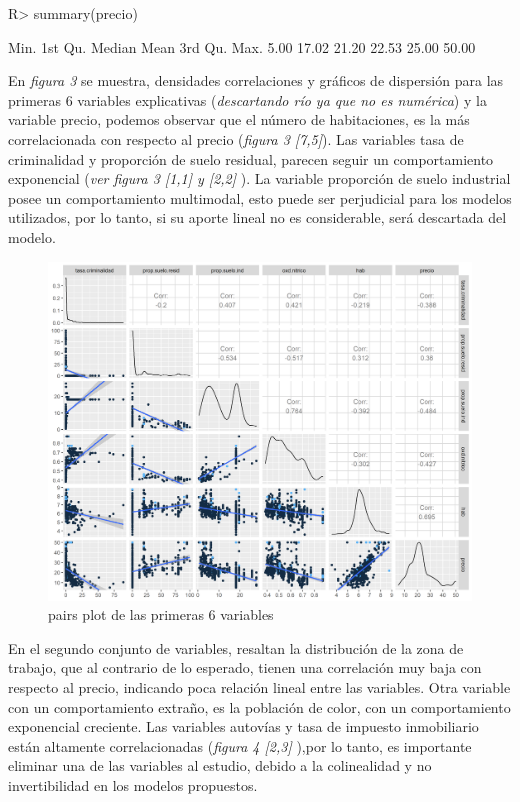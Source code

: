 \documentclass[nojss]{jss}
\begin{document}
\begin{CodeChunk}
\begin{CodeInput}
   R> summary(precio)
\end{CodeInput}

\begin{CodeOutput}
	Min.  1st Qu.  Median  Mean   3rd Qu.  Max. 
	5.00   17.02   21.20   22.53   25.00   50.00 
\end{CodeOutput}
\end{CodeChunk}

En \textit{figura 3} se muestra, densidades correlaciones y gráficos de dispersión para las primeras 6 variables explicativas (\textit{descartando río ya que no es numérica}) y la variable precio, podemos observar que el número de habitaciones, es la más correlacionada con respecto al precio (\textit{figura 3 [7,5]}). Las variables tasa de criminalidad y proporción de suelo residual, parecen seguir un comportamiento exponencial (\textit{ver figura 3 [1,1] y [2,2]} ). La variable proporción de suelo industrial posee un comportamiento multimodal, esto puede ser perjudicial para los modelos utilizados, por lo tanto, si su aporte lineal no es considerable, será descartada del modelo.  
  
\begin{figure}[H]
	\centering
	\includegraphics[scale=1]{images/pairs1-1}
	\caption[pairs]{pairs plot de las primeras 6 variables}
	\label{fig:fig3}
\end{figure}  

En el segundo conjunto de variables, resaltan la distribución de la zona de trabajo, que al contrario de lo esperado, tienen una correlación muy baja con respecto al precio, indicando poca relación lineal entre las variables. Otra variable con un comportamiento extraño, es la población de color, con un comportamiento exponencial creciente. Las variables autovías y tasa de impuesto inmobiliario están altamente correlacionadas (\textit{figura 4 [2,3]} ),por lo tanto, es importante eliminar una de las variables al estudio, debido a la colinealidad y no invertibilidad en los modelos propuestos. \\  
\end{document}

